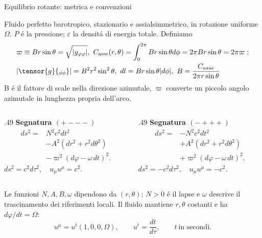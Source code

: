 \begin{frame}[t]{Equilibrio rotante: metrica e convenzioni}
\small\raggedright
Fluido perfetto barotropico, stazionario e assialsimmetrico,
in rotazione uniforme $\Omega$.
$P$ \'e la pressione; $\varepsilon$ la densit\'a di energia totale. Definiamo
\begin{align*}
&\varpi\equiv Br\sin\theta=\sqrt{|g_{\varphi\varphi}|},\ C_{\rm asse}(r,\theta)=\int_0^{2\pi}Br\sin{\theta}d\phi=2\pi Br\sin{\theta}=2\pi\varpi:\\
&|\tensor{g}{_{\phi\phi}}|=B^2r^2\sin^2\theta,\ dl=Br\sin{\theta}|d\phi|,\ B=\frac{C_{asse}}{2\pi r \sin{\theta}}
\end{align*}
B \'e il fattore di scale nella direzione azimutale, $\varpi$ converte un piccolo angolo azimutale in lunghezza propria dell'arco.
\begin{columns}[T,onlytextwidth]
\begin{column}{.49\textwidth}
\centering\textbf{Segnatura $(+---)$}
\[
\begin{aligned}
ds^2={}&N^2c^2dt^2\\
&-A^2(dr^2+r^2d\theta^2)\\
&-\varpi^2(d\varphi-\omega\,dt)^2.
\end{aligned}
\]
\(ds^2=c^2d\tau^2,\quad u_\mu u^\mu=c^2.\)
\end{column}
\begin{column}{.49\textwidth}
\centering\textbf{Segnatura $(-+++)$}
\[
\begin{aligned}
ds^2={}&-N^2c^2dt^2\\
&+A^2(dr^2+r^2d\theta^2)\\
&+\varpi^2(d\varphi-\omega\,dt)^2.
\end{aligned}
\]
\(ds^2=-c^2d\tau^2,\quad u_\mu u^\mu=-c^2.\)
\end{column}
\end{columns}
\smallskip
Le funzioni $N,A,B,\omega$ dipendono da $(r,\theta)$; $N>0$ \'e il lapse
e $\omega$ descrive il trascinamento dei riferimenti locali.
Il fluido mantiene $r,\theta$ costanti e ha $d\varphi/dt=\Omega$:
\[
u^\mu=u^t(1,0,0,\Omega),\qquad u^t=\frac{dt}{d\tau},
\qquad t\ \text{in secondi}.
\]
\end{frame}


